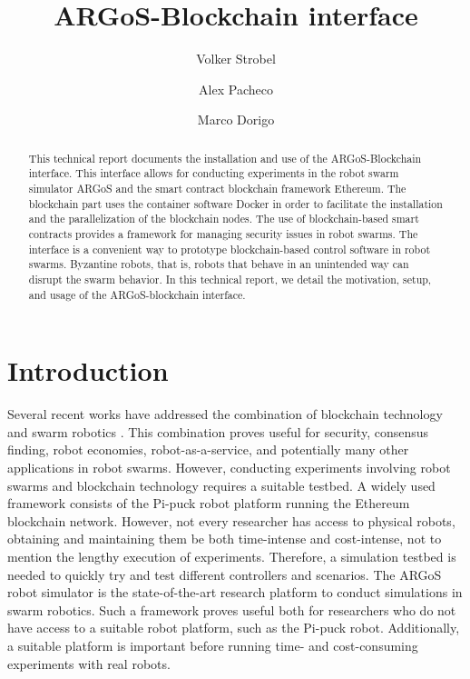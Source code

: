 \documentclass{article}
\title{ARGoS-Blockchain interface}
\author{Volker Strobel \and Alex Pacheco \and Marco Dorigo}
\begin{document}
\maketitle

\begin{abstract}

  This technical report documents the installation and use of the
  ARGoS-Blockchain interface. This interface allows for conducting
  experiments in the robot swarm simulator ARGoS and the smart
  contract blockchain framework Ethereum. The blockchain part uses the
  container software Docker in order to facilitate the installation
  and the parallelization of the blockchain nodes. The use of
  blockchain-based smart contracts provides a framework for managing
  security issues in robot swarms. The interface is a convenient way
  to prototype blockchain-based control software in robot
  swarms. Byzantine robots, that is, robots that behave in an
  unintended way can disrupt the swarm behavior. In this technical
  report, we detail the motivation, setup, and usage of the
  ARGoS-blockchain interface.

\end{abstract}

\section{Introduction}

Several recent works have addressed the combination of blockchain
technology and swarm robotics
\cite{StrCasDor2018:aamas,StrDor2018:ants,StrFerDor2017:techreport-013}. This
combination proves useful for security, consensus finding, robot
economies, robot-as-a-service, and potentially many other applications
in robot swarms. However, conducting experiments involving robot
swarms and blockchain technology requires a suitable testbed. A widely
used framework consists of the Pi-puck robot platform running the
Ethereum blockchain network. However, not every researcher has access
to physical robots, obtaining and maintaining them be both
time-intense and cost-intense, not to mention the lengthy execution of
experiments. Therefore, a simulation testbed is needed to quickly try
and test different controllers and scenarios. The ARGoS robot
simulator \citep{PinTriOGr-etal2012:si} is the state-of-the-art
research platform to conduct simulations in swarm robotics. Such a
framework proves useful both for researchers who do not have access to
a suitable robot platform, such as the Pi-puck robot. Additionally, a
suitable platform is important before running time- and cost-consuming
experiments with real robots.
\end{document}
